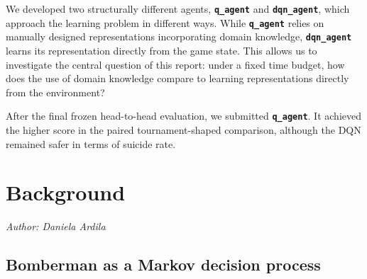 \documentclass[11pt]{article}
\newcommand{\authorline}[1]{\noindent\textit{Author: #1}\par\medskip}
\newcommand{\code}[1]{\texttt{#1}}
\begin{document}
We developed two structurally different agents, \textbf{\code{q\_agent}} and \textbf{\code{dqn\_agent}}, which approach the learning problem in different ways. While \textbf{\code{q\_agent}} relies on manually designed representations incorporating domain knowledge, \textbf{\code{dqn\_agent}} learns its representation directly from the game state. This allows us to investigate the central question of this report: under a fixed time budget, how does the use of domain knowledge compare to learning representations directly from the environment?

After the final frozen head-to-head evaluation, we submitted \textbf{\code{q\_agent}}. It achieved the higher score in the paired tournament-shaped comparison, although the DQN remained safer in terms of suicide rate.


\section{Background}
\label{sec:background}
\authorline{Daniela Ardila}
\subsection{Bomberman as a Markov decision process}
\label{sec:bg-mdp}
 
\end{document}

